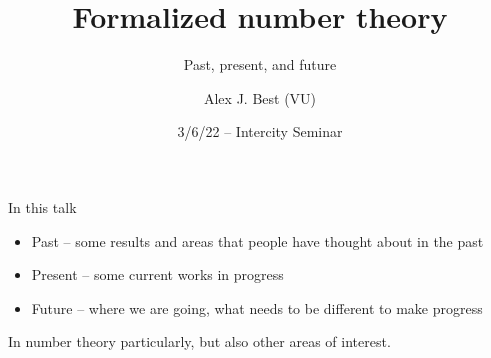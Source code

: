 \newcommand{\sheaf}[1]{\operatorname{\mathcal{#1}}}
\newcommand{\inv}{^{-1}}
\DeclareMathOperator{\norm}{Nm}
\DeclareMathOperator{\ord}{ord}
\DeclareMathOperator{\divisor}{div}
\DeclareMathOperator{\PP}{\mathbf{P}}
\DeclareMathOperator{\Hom}{Hom}
\DeclareMathOperator{\Mat}{Mat}
\DeclareMathOperator{\End}{End}

\newcommand{\lb}{[}
\newcommand{\rb}{]}


\usepackage{listings}
\def\lstlanguagefiles{tex/lstlean.tex}

\lstset{language=lean,basicstyle=\ttfamily\scriptsize}



\author{Alex J. Best (VU)}
\date{3/6/22 -- Intercity Seminar}
\title{Formalized number theory}
\subtitle{Past, present, and future}



\begin{frame}
  \titlepage

\end{frame}


\begin{frame}{In this talk}
    \begin{itemize}
        \item Past -- some results and areas that people have thought about in the past
        \item Present -- some current works in progress
        \item Future -- where we are going, what needs to be different to make progress
    \end{itemize}
    In number theory particularly, but also other areas of interest.
\end{frame}


\newcommand{\comment}[2]{#2}

